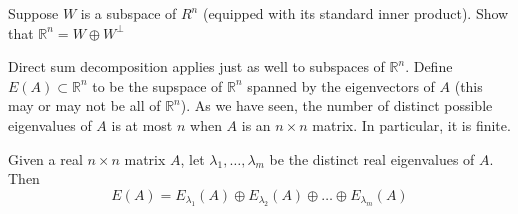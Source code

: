 \begin{exercise} Suppose $W$ is a subspace of $R^n$ (equipped with its standard inner product). Show that $\mathbb R^n = W\oplus W^{\perp}$
\end{exercise}

Direct sum decomposition applies just as well to subspaces of $\mathbb R^n$. Define $E(A)\subset\mathbb R^n$ to be the supspace of $\mathbb R^n$ spanned by the eigenvectors of $A$ (this may or may not be all of $\mathbb R^n$). As we have seen, the number of distinct possible eigenvalues of $A$ is at most $n$ when $A$ is an $n\times n$ matrix. In particular, it is finite.

\begin{theorem} Given a real $n\times n$ matrix $A$, let $\lambda_1,\dots,\lambda_m$ be the distinct real eigenvalues of $A$. Then 
\[
E(A) = E_{\lambda_1}(A)\oplus E_{\lambda_2}(A)\oplus\dots\oplus E_{\lambda_m}(A)
\]
\end{theorem}

